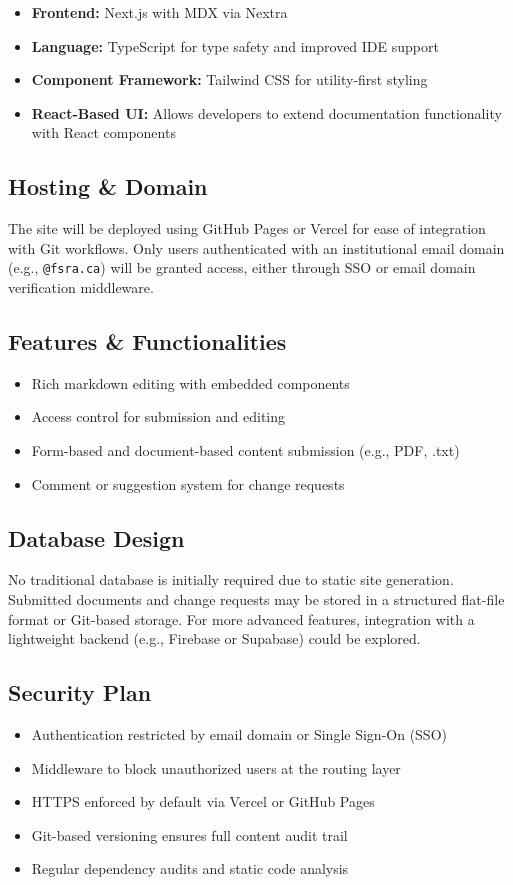 \documentclass[11pt,a4paper]{article}
\begin{document}
    \begin{itemize}
      \item \textbf{Frontend:} Next.js with MDX via Nextra
      \item \textbf{Language:} TypeScript for type safety and improved IDE support
      \item \textbf{Component Framework:} Tailwind CSS for utility-first styling
      \item \textbf{React-Based UI:} Allows developers to extend documentation functionality with React components
    \end{itemize}

  \subsection{Hosting \& Domain}
    The site will be deployed using GitHub Pages or Vercel for ease of integration with Git workflows. Only users authenticated with an institutional email domain (e.g., \texttt{@fsra.ca}) will be granted access, either through SSO or email domain verification middleware.

  \subsection{Features \& Functionalities}
    \begin{itemize}
      \item Rich markdown editing with embedded components
      \item Access control for submission and editing
      \item Form-based and document-based content submission (e.g., PDF, .txt)
      \item Comment or suggestion system for change requests
    \end{itemize}

  \subsection{Database Design}
    No traditional database is initially required due to static site generation. Submitted documents and change requests may be stored in a structured flat-file format or Git-based storage. For more advanced features, integration with a lightweight backend (e.g., Firebase or Supabase) could be explored.

  \subsection{Security Plan}
    \begin{itemize}
      \item Authentication restricted by email domain or Single Sign-On (SSO)
      \item Middleware to block unauthorized users at the routing layer
      \item HTTPS enforced by default via Vercel or GitHub Pages
      \item Git-based versioning ensures full content audit trail
      \item Regular dependency audits and static code analysis
    \end{itemize}
\end{document}

